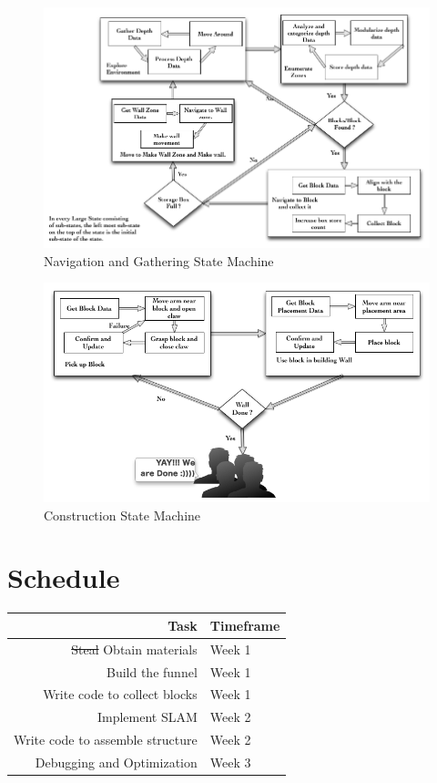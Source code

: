 \documentclass[letterpaper,11pt]{article}
\begin{document}
\begin{figure}[h]
\centering
 \includegraphics[width=6.25in]{images/RSSfsmbigTeam}
\caption{Navigation and Gathering State Machine}
\end{figure}

\begin{figure}[h!]
\centering
 \includegraphics[width=6.25in]{images/WallBuilding}
\caption{Construction State Machine}
\end{figure}

\newpage

\section{Schedule}
\begin{tabular}{r | l}
Task & Timeframe\\
\hline
\sout{Steal} Obtain materials    & Week 1 \\
Build the funnel                 & Week 1 \\
Write code to collect blocks     & Week 1 \\
Implement SLAM                   & Week 2 \\
Write code to assemble structure & Week 2 \\
Debugging and Optimization       & Week 3
\end{tabular}
\end{document}
